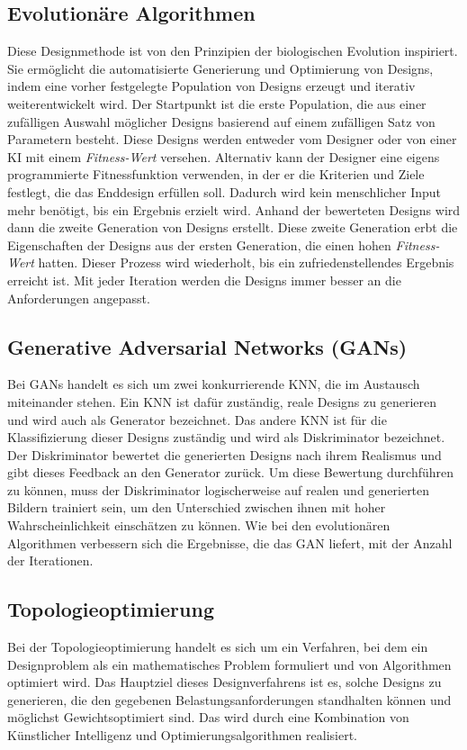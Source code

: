\subsection*{Evolutionäre Algorithmen}
Diese Designmethode ist von den Prinzipien der biologischen Evolution inspiriert. Sie ermöglicht die automatisierte Generierung und Optimierung von Designs, indem eine vorher festgelegte Population von Designs erzeugt und iterativ weiterentwickelt wird.
Der Startpunkt ist die erste Population, die aus einer zufälligen Auswahl möglicher Designs basierend auf einem zufälligen Satz von Parametern besteht. Diese Designs werden entweder vom Designer oder von einer KI mit einem \textit{Fitness-Wert} versehen. Alternativ kann der Designer eine eigens programmierte Fitnessfunktion verwenden, in der er die Kriterien und Ziele festlegt, die das Enddesign erfüllen soll. Dadurch wird kein menschlicher Input mehr benötigt, bis ein Ergebnis erzielt wird. Anhand der bewerteten Designs wird dann die zweite Generation von Designs erstellt. Diese zweite Generation erbt die Eigenschaften der Designs aus der ersten Generation, die einen hohen \textit{Fitness-Wert} hatten. Dieser Prozess wird wiederholt, bis ein zufriedenstellendes Ergebnis erreicht ist. Mit jeder Iteration werden die Designs immer besser an die Anforderungen angepasst.\autocite{3}

\subsection*{Generative Adversarial Networks (GANs)}
Bei \ac*{GANs} handelt es sich um zwei konkurrierende \ac{KNN}, die im Austausch miteinander stehen. Ein \ac*{KNN} ist dafür zuständig, reale Designs zu generieren und wird auch als Generator bezeichnet. Das andere \ac*{KNN} ist für die Klassifizierung dieser Designs zuständig und wird als Diskriminator bezeichnet. Der Diskriminator bewertet die generierten Designs nach ihrem Realismus und gibt dieses Feedback an den Generator zurück. Um diese Bewertung durchführen zu können, muss der Diskriminator logischerweise auf realen und generierten Bildern trainiert sein, um den Unterschied zwischen ihnen mit hoher Wahrscheinlichkeit einschätzen zu können. Wie bei den evolutionären Algorithmen verbessern sich die Ergebnisse, die das \ac*{GAN} liefert, mit der Anzahl der Iterationen.\autocite{4}\autocite{11}

\label{chap:topology}
\subsection*{Topologieoptimierung}
Bei der Topologieoptimierung handelt es sich um ein Verfahren, bei dem ein Designproblem als ein mathematisches Problem formuliert und von Algorithmen optimiert wird. Das Hauptziel dieses Designverfahrens ist es, solche Designs zu generieren, die den gegebenen Belastungsanforderungen standhalten können und möglichst Gewichtsoptimiert sind. Das wird durch eine Kombination von Künstlicher Intelligenz und Optimierungsalgorithmen realisiert. 

